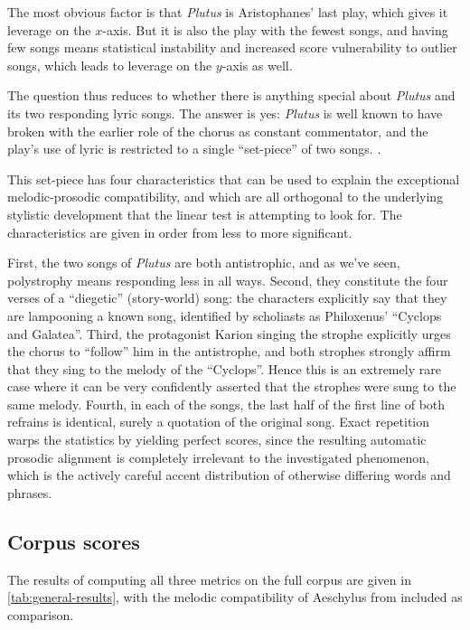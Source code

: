 \documentclass[twoside]{article}
\begin{document}
The most obvious factor is that \textit{Plutus} is Aristophanes’ last play, which gives it leverage on the $x$-axis. But it is also the play with the fewest songs, and having few songs means statistical instability and increased score vulnerability to outlier songs, which leads to leverage on the $y$-axis as well. 

The question thus reduces to whether there is anything special about \textit{Plutus} and its two responding lyric songs. The answer is yes: \textit{Plutus} is well known to have broken with the earlier role of the chorus as constant commentator, and the play's use of lyric is restricted to a single ``set-piece'' of two songs. \parencite[555]{parkerSongsAristophanes1997}. 

This set-piece has four characteristics that can be used to explain the exceptional melodic-prosodic compatibility, and which are all orthogonal to the underlying stylistic development that the linear test is attempting to look for. The characteristics are given in order from less to more significant. 

First, the two songs of \textit{Plutus} are both antistrophic, and as we’ve seen, polystrophy means responding less in all ways. Second, they constitute the four verses of a ``diegetic'' (story-world) song: the characters explicitly say that they are lampooning a known song, identified by scholiasts as Philoxenus’ ``Cyclops and Galatea''. Third, the protagonist Karion singing the strophe explicitly urges the chorus to ``follow'' him in the antistrophe, and both strophes strongly affirm that they sing to the melody of the ``Cyclops''. Hence this is an extremely rare case where it can be very confidently asserted that the strophes were sung to the same melody. Fourth, in each of the songs, the last half of the first line of both refrains is identical, surely a quotation of the original song. Exact repetition warps the statistics by yielding perfect scores, since the resulting automatic prosodic alignment is completely irrelevant to the investigated phenomenon, which is the actively careful accent distribution of otherwise differing words and phrases.

\subsection{Corpus scores}

The results of computing all three metrics on the full corpus are given in \autoref{tab:general-results}, with the melodic compatibility of Aeschylus from \textcite{conserPitchAccentMelody2020} included as comparison.
\end{document}
